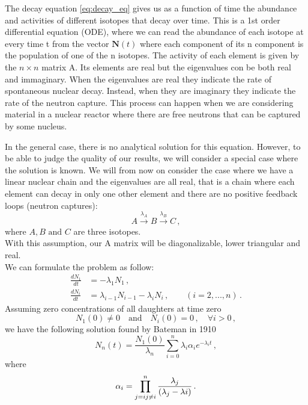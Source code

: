 The decay equation \ref{eq:decay_eq} gives us as a function of time the abundance and activities of different isotopes that decay over time.
This is a 1st order differential equation (ODE), where we can read the abundance of each isotope at every time t from the vector $\mathbf{N}(t)$ where each component of its n component is the population of one of the n isotopes. The activity of each element is given by the $n \times n$ matrix A. Its elements are real but the eigenvalues con be both real and immaginary. When the eigenvalues are real they indicate the rate of spontaneous nuclear decay. Instead, when they are imaginary they indicate the rate of the neutron capture. This process can happen when we are considering material in a nuclear reactor where there are free neutrons that can be captured by some nucleus.

In the general case, there is no analytical solution for this equation. However, to be able to judge the quality of our results, we will consider a special case where the solution is known.
We will from now on consider the case where we have a linear nuclear chain and the eigenvalues are all real, that is a chain where each element can decay in only one other element and there are no positive feedback loops (neutron captures):
\begin{equation}\label{decay_chain}
     A \xrightarrow{\lambda_{A}} B \xrightarrow{\lambda_{B}} C \, ,
\end{equation}
where $A, B \text{ and } C$ are three isotopes.\\
With this assumption, our A matrix will be diagonalizable, lower triangular and real.\\
We can formulate the problem as follow:
\begin{align}
    \frac{dN_{1}}{dt} &= - \lambda_{1} N_{1} \,,\\
    \frac{dN_{i}}{dt} &= \lambda_{i-1} N_{i-1} - \lambda_{i} N_{i} \,,\qquad (i=2,...,n) \,.
\end{align}
Assuming zero concentrations of all daughters at time 
zero
\begin{equation}
    N_{1}(0) \neq 0 \quad \text{and} \quad N_{i}(0) = 0 \,,\quad \forall i > 0 \,,
\end{equation}
we have the following solution found by Bateman in 1910
\begin{equation}
    N_{n}(t) = \frac{N_{1}(0)}{\lambda_{n}} \sum_{i=0}^{n} \lambda_{i}\alpha_{i}e^{-\lambda_{i}t}\,,
\end{equation}
where
\begin{equation}
    \alpha_{i} = \prod_{j=i\\ j \neq i}^{n} \frac{\lambda_{j}}{(\lambda_{j} - \lambda{i})}\,.
\end{equation}

